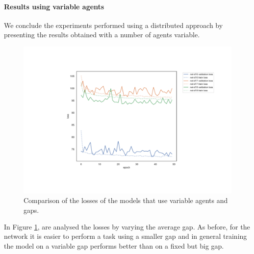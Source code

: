 \paragraph*{Results using variable agents}
We conclude the experiments performed using a distributed approach by 
presenting the results obtained with a number of agents variable. 
\begin{figure}[H]
	\centering
	\includegraphics[width=.8\textwidth]{contents/images/task1-extension/loss-distributed-Nvar@}%
	\caption[Comparison of the losses of the models that use variable 
	agents.]{Comparison of the losses of the models that use variable agents 
	and gaps.}
	\label{fig:distlossnvar}
\end{figure}

\noindent
In Figure \ref{fig:distlossnvar}, are analysed the losses by varying the average 
gap. As before, for the network it is easier to perform a task using a smaller gap 
and in general training the model on a variable gap performs better than on a 
fixed but big gap.


